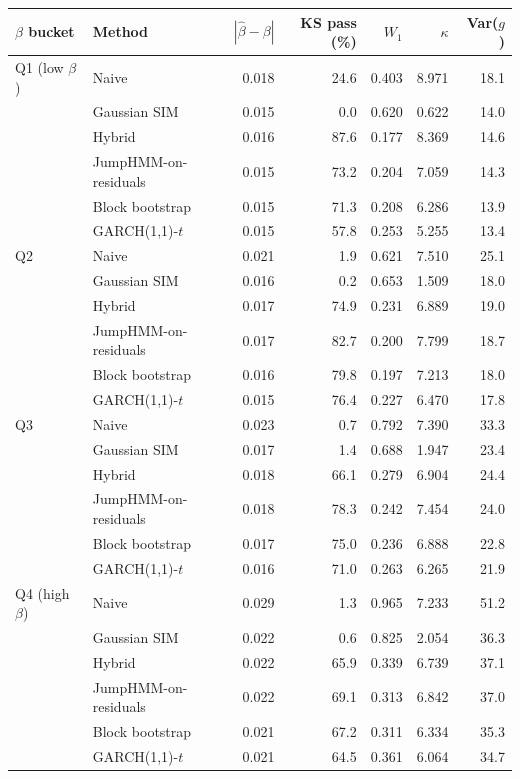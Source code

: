 \begin{tabular}{llrrrrr}
\toprule
$\beta$ bucket & Method & $|\hat\beta-\beta|$ & KS pass (\%) & $W_1$ & $\kappa$ & Var($g$) \\
\midrule
Q1 (low $\beta$) & Naive & 0.018 & 24.6 & 0.403 & 8.971 & 18.1 \\
 & Gaussian SIM & 0.015 & 0.0 & 0.620 & 0.622 & 14.0 \\
 & Hybrid & 0.016 & 87.6 & 0.177 & 8.369 & 14.6 \\
 & JumpHMM-on-residuals & 0.015 & 73.2 & 0.204 & 7.059 & 14.3 \\
 & Block bootstrap & 0.015 & 71.3 & 0.208 & 6.286 & 13.9 \\
 & GARCH(1,1)-$t$ & 0.015 & 57.8 & 0.253 & 5.255 & 13.4 \\
Q2 & Naive & 0.021 & 1.9 & 0.621 & 7.510 & 25.1 \\
 & Gaussian SIM & 0.016 & 0.2 & 0.653 & 1.509 & 18.0 \\
 & Hybrid & 0.017 & 74.9 & 0.231 & 6.889 & 19.0 \\
 & JumpHMM-on-residuals & 0.017 & 82.7 & 0.200 & 7.799 & 18.7 \\
 & Block bootstrap & 0.016 & 79.8 & 0.197 & 7.213 & 18.0 \\
 & GARCH(1,1)-$t$ & 0.015 & 76.4 & 0.227 & 6.470 & 17.8 \\
Q3 & Naive & 0.023 & 0.7 & 0.792 & 7.390 & 33.3 \\
 & Gaussian SIM & 0.017 & 1.4 & 0.688 & 1.947 & 23.4 \\
 & Hybrid & 0.018 & 66.1 & 0.279 & 6.904 & 24.4 \\
 & JumpHMM-on-residuals & 0.018 & 78.3 & 0.242 & 7.454 & 24.0 \\
 & Block bootstrap & 0.017 & 75.0 & 0.236 & 6.888 & 22.8 \\
 & GARCH(1,1)-$t$ & 0.016 & 71.0 & 0.263 & 6.265 & 21.9 \\
Q4 (high $\beta$) & Naive & 0.029 & 1.3 & 0.965 & 7.233 & 51.2 \\
 & Gaussian SIM & 0.022 & 0.6 & 0.825 & 2.054 & 36.3 \\
 & Hybrid & 0.022 & 65.9 & 0.339 & 6.739 & 37.1 \\
 & JumpHMM-on-residuals & 0.022 & 69.1 & 0.313 & 6.842 & 37.0 \\
 & Block bootstrap & 0.021 & 67.2 & 0.311 & 6.334 & 35.3 \\
 & GARCH(1,1)-$t$ & 0.021 & 64.5 & 0.361 & 6.064 & 34.7 \\
\bottomrule
\end{tabular}
